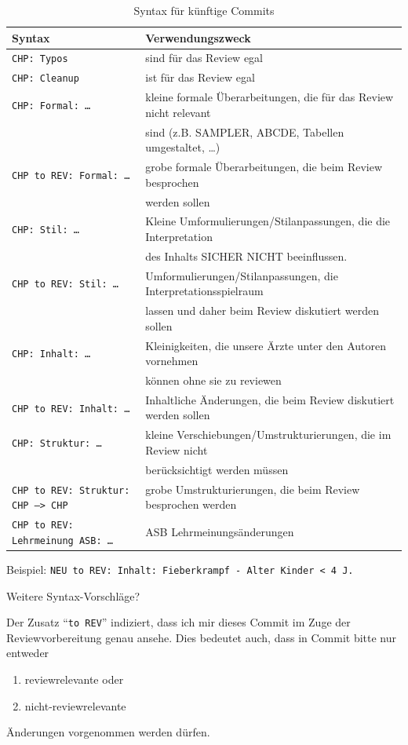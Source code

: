 \documentclass[
ngerman,
paper=a4,
asymmetric,
fontsize=10pt,
draft=false,
numbers=noenddot,
bibtotocnumbered,
footnotes=multiple,
]{scrreprt}
\begin{document}
\begin{enumerate}
\begin{table}[H]
\centering
\caption{Syntax für künftige Commits}
\begin{tabular}{ll}
\toprule
Syntax & Verwendungszweck\\
\midrule
\texttt{CHP: Typos} & sind für das Review egal\\
\texttt{CHP: Cleanup} &  ist für das Review egal\\
\texttt{CHP: Formal: \ldots} & kleine formale Überarbeitungen, die für das
Review nicht relevant\\ & sind (z.B.
  SAMPLER, ABCDE, Tabellen umgestaltet, \ldots)\\
 \texttt{CHP to REV: Formal: \ldots} &  grobe formale Überarbeitungen, die beim
 Review besprochen\\ &  werden sollen\\
\texttt{CHP: Stil: \ldots} & Kleine Umformulierungen/Stilanpassungen, die die
Interpretation\\ & des Inhalts SICHER NICHT beeinflussen.\\
 \texttt{CHP to REV: Stil: \ldots} &  Umformulierungen/Stilanpassungen, die
 Interpretationsspielraum\\ &   lassen und daher beim Review diskutiert werden
 sollen\\
  \texttt{CHP: Inhalt: \ldots} & Kleinigkeiten, die unsere Ärzte unter den
  Autoren vornehmen\\ &  können ohne sie zu reviewen\\
  \texttt{CHP to REV: Inhalt: \ldots} & Inhaltliche Änderungen, die beim Review
  diskutiert werden sollen\\ 
  \texttt{CHP: Struktur: \ldots} & kleine Verschiebungen/Umstrukturierungen, die
  im Review nicht\\ &  berücksichtigt werden müssen\\
  \texttt{CHP to REV: Struktur: CHP --> CHP} & grobe Umstrukturierungen, die
  beim Review besprochen werden\\
  \texttt{CHP to REV: Lehrmeinung ASB: \ldots} & ASB Lehrmeinungsänderungen\\
\bottomrule
\end{tabular}
\end{table}

  Beispiel:\newline
  \texttt{NEU to REV: Inhalt: Fieberkrampf - Alter Kinder < 4 J.}

 Weitere Syntax-Vorschläge?

Der Zusatz "`\texttt{to REV}"' indiziert, dass ich mir dieses Commit im Zuge der
Reviewvorbereitung genau ansehe. Dies bedeutet auch, dass in  Commit
bitte nur entweder
\begin{enumerate}
  \item reviewrelevante oder
  \item nicht-reviewrelevante
\end{enumerate}
Änderungen vorgenommen werden dürfen.
\end{enumerate}
\end{document}

